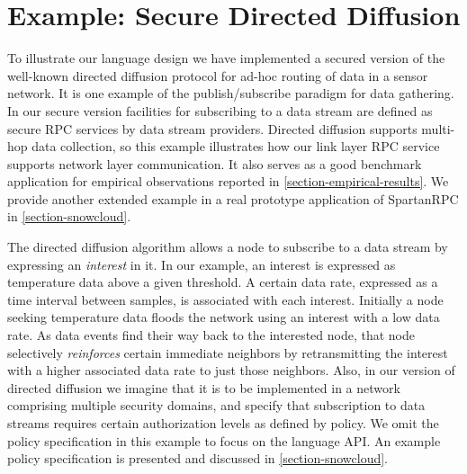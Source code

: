 \section{Example: Secure Directed Diffusion}
\label{section-example}

To illustrate our language design we have implemented a secured version
of the well-known directed diffusion protocol \cite{intanagonwiwat-2003}
for ad-hoc routing of data in a sensor network. It is one example of the
publish/subscribe paradigm for data gathering. In our secure version
facilities for subscribing to a data stream are defined as secure RPC
services by data stream providers. Directed diffusion supports multi-hop
data collection, so this example illustrates how our link layer RPC
service supports network layer communication. It also serves as a good
benchmark application for empirical observations reported in
\autoref{section-empirical-results}. We provide another extended example
in a real prototype application of SpartanRPC in
\autoref{section-snowcloud}.

The directed diffusion algorithm \cite{intanagonwiwat-2003} allows a
node to subscribe to a data stream by expressing an \emph{interest} in
it. In our example, an interest is expressed as temperature data above a
given threshold. A certain data rate, expressed as a time interval
between samples, is associated with each interest. Initially a node
seeking temperature data floods the network using an interest with a low
data rate. As data events find their way back to the interested node,
that node selectively \emph{reinforces} certain immediate neighbors by
retransmitting the interest with a higher associated data rate to just
those neighbors. Also, in our version of directed diffusion we imagine
that it is to be implemented in a network comprising multiple security
domains, and specify that subscription to data streams requires certain
authorization levels as defined by policy. We omit the policy
specification in this example to focus on the language API. An example
policy specification is presented and discussed in
\autoref{section-snowcloud}.

